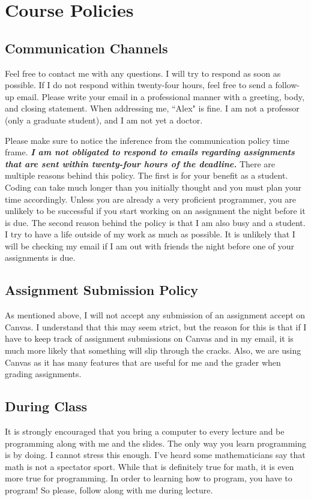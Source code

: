 \documentclass[11pt]{article}
\begin{document}
\section*{Course Policies}\label{sec:Policies}

\subsection*{Communication Channels}
Feel free to contact me with any questions. I will try to respond as soon as possible. If I do not respond within twenty-four hours, feel free to send a follow-up email. Please write your email in a professional manner with a greeting, body, and closing statement. When addressing me, ``Alex" is fine. I am not a professor (only a graduate student), and I am not yet a doctor. 

Please make sure to notice the inference from the communication policy time frame. \textit{\textbf{I am not obligated to respond to emails regarding assignments that are sent within twenty-four hours of the deadline.}} There are multiple reasons behind this policy. The first is for your benefit as a student. Coding can take much longer than you initially thought and you must plan your time accordingly. Unless you are already a very proficient programmer, you are unlikely to be successful if you start working on an assignment the night before it is due. The second reason behind the policy is that I am also busy and a student. I try to have a life outside of my work as much as possible. It is unlikely that I will be checking my email if I am out with friends the night before one of your assignments is due. 

\subsection*{Assignment Submission Policy}

As mentioned above, I will not accept any submission of an assignment accept on Canvas. I understand that this may seem strict, but the reason for this is that if I have to keep track of assignment submissions on Canvas and in my email, it is much more likely that something will slip through the cracks. Also, we are using Canvas as it has many features that are useful for me and the grader when grading assignments. 

\subsection*{During Class}
It is strongly encouraged that you bring a computer to every lecture and be programming along with me and the slides. The only way you learn programming is by doing. I cannot stress this enough. I've heard some mathematicians say that math is not a spectator sport. While that is definitely true for math, it is even more true for programming. In order to learning how to program, you have to program! So please, follow along with me during lecture. 
\end{document}
